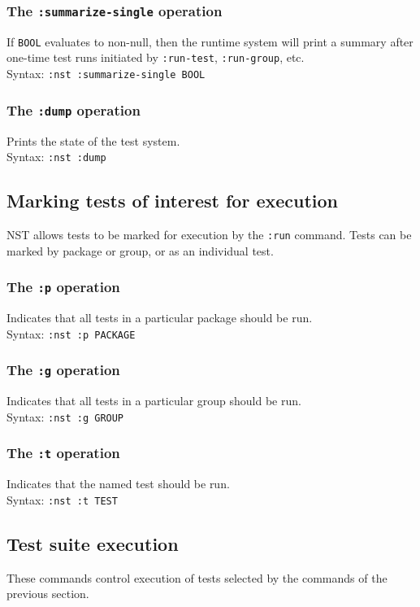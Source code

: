 \documentclass{article}
\begin{document}
\subsubsection{The \texttt{:summarize-single} operation}
%
If \texttt{BOOL} evaluates to non-null, then the runtime system will
print a summary after one-time test runs initiated by
\texttt{:run-test}, \texttt{:run-group}, etc.
\\ Syntax: \texttt{:nst :summarize-single BOOL}

\subsubsection{The \texttt{:dump} operation}
%
Prints the state of the test system.
\\ Syntax: \texttt{:nst :dump}

\subsection{Marking tests of interest for execution}
\label{nominating-tests}
NST allows tests to be marked for execution by the \texttt{:run}
command.  Tests can be marked by package or group, or as an individual
test.

\subsubsection{The \texttt{:p} operation}
%
Indicates that all tests in a particular package should be run.
\\ Syntax: \texttt{:nst :p PACKAGE}

\subsubsection{The \texttt{:g} operation}
%
Indicates that all tests in a particular group should be run.
\\ Syntax: \texttt{:nst :g GROUP}

\subsubsection{The \texttt{:t} operation}
%
Indicates that the named test should be run.
\\ Syntax: \texttt{:nst :t TEST}

\subsection{Test suite execution}
These commands control execution of tests selected by the commands of
the previous section.
\end{document}
